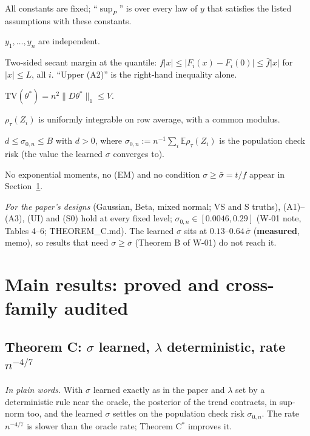 \documentclass[11pt]{article}
\newcommand{\E}{\mathbb{E}}
\newcommand{\norm}[1]{\lVert #1\rVert}
\newcommand{\TV}{\mathrm{TV}}
\newcommand{\sbar}{\bar\sigma}
\newcommand{\szero}{\sigma_{0,n}}
\newcommand{\ME}{\textbf{measured}}
\theoremstyle{plain}
\newcommand{\plainly}[1]{\par\smallskip\noindent\textit{In plain words.} #1\par\smallskip}
\begin{document}
All constants are fixed; ``$\sup_P$'' is over every law of $y$ that satisfies the listed assumptions with these constants.
\begin{description}[leftmargin=0pt]
\item[(A1)] $y_1,\dots,y_n$ are independent.
\item[(A2)] Two-sided secant margin at the quantile: $f|x|\le|F_i(x)-F_i(0)|\le\bar f|x|$ for $|x|\le L$, all $i$. ``Upper (A2)'' is the right-hand inequality alone.
\item[(A3)] $\TV(\theta^*)=n^2\norm{D\theta^*}_1\le V$.
\item[(UI)] $\rho_\tau(Z_i)$ is uniformly integrable on row average, with a common modulus.
\item[(S0)] $d\le\szero\le B$ with $d>0$, where $\szero:=n^{-1}\sum_i\E\rho_\tau(Z_i)$ is the population check risk (the value the learned $\sigma$ converges to).
\end{description}
No exponential moments, no (EM) and no condition $\sigma\ge\sbar=t/f$ appear in Section~\ref{sec:main}.

\noindent\textit{For the paper's designs} (Gaussian, Beta, mixed normal; VS and S truths), (A1)--(A3), (UI) and (S0) hold at every fixed level; $\szero\in[0.0046,0.29]$ (W-01 note, Tables 4--6; THEOREM\_C.md). The learned $\sigma$ sits at $0.13$--$0.64\,\sbar$ (\ME, memo), so results that need $\sigma\ge\sbar$ (Theorem B of W-01) do not reach it.

\section{Main results: proved and cross-family audited}
\label{sec:main}

\subsection{\texorpdfstring{Theorem C: $\sigma$ learned, $\lambda$ deterministic, rate $n^{-4/7}$}{Theorem C: sigma learned, lambda deterministic}}

\plainly{With $\sigma$ learned exactly as in the paper and $\lambda$ set by a deterministic rule near the oracle, the posterior of the trend contracts, in sup-norm too, and the learned $\sigma$ settles on the population check risk $\szero$. The rate $n^{-4/7}$ is slower than the oracle rate; Theorem C$^*$ improves it.}
\end{document}

